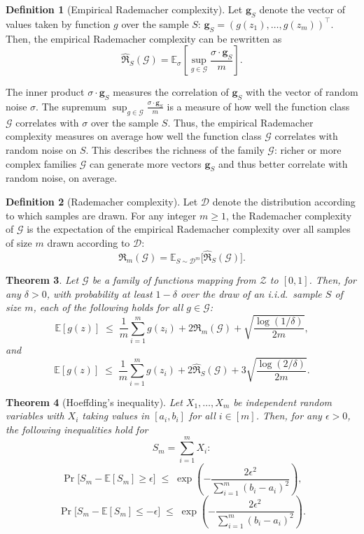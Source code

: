 \documentclass[12pt]{article}
\theoremstyle{definition} %
\newtheorem{definition}{Definition}[section]
\theoremstyle{plain} %
\newtheorem{theorem}[definition]{Theorem}
\theoremstyle{remark} %
\begin{document}
\begin{CJK}{UTF8}{gbsn}
\begin{definition}[Empirical Rademacher complexity]
Let $\mathbf{g}_S$ denote the vector of values taken by function $g$ over the sample $S$: 
$\mathbf{g}_S = (g(z_1), \ldots, g(z_m))^\top$. Then, the empirical Rademacher complexity 
can be rewritten as
\[
\hat{\mathfrak{R}}_S(\mathcal{G}) 
= \mathbb{E}_{\sigma} \left[ \sup_{g \in \mathcal{G}} \frac{\sigma \cdot \mathbf{g}_S}{m} \right].
\]

The inner product $\sigma \cdot \mathbf{g}_S$ measures the correlation of $\mathbf{g}_S$ 
with the vector of random noise $\sigma$. The supremum 
$\sup_{g \in \mathcal{G}} \frac{\sigma \cdot \mathbf{g}_S}{m}$ is a measure of how well 
the function class $\mathcal{G}$ correlates with $\sigma$ over the sample $S$. 
Thus, the empirical Rademacher complexity measures on average how well the function 
class $\mathcal{G}$ correlates with random noise on $S$. This describes the richness of 
the family $\mathcal{G}$: richer or more complex families $\mathcal{G}$ can generate more 
vectors $\mathbf{g}_S$ and thus better correlate with random noise, on average.
\end{definition}

\begin{definition}[Rademacher complexity]
Let $\mathcal{D}$ denote the distribution according to which samples are drawn. 
For any integer $m \geq 1$, the Rademacher complexity of $\mathcal{G}$ is the expectation of the 
empirical Rademacher complexity over all samples of size $m$ drawn according to $\mathcal{D}$:
\[
\mathfrak{R}_m(\mathcal{G}) 
= \mathbb{E}_{S \sim \mathcal{D}^m} \big[ \hat{\mathfrak{R}}_S(\mathcal{G}) \big].
\tag{3.2}
\]
\end{definition}

\begin{theorem}
Let $\mathcal{G}$ be a family of functions mapping from $\mathcal{Z}$ to $[0,1]$. 
Then, for any $\delta > 0$, with probability at least $1 - \delta$ over the draw of 
an i.i.d.\ sample $S$ of size $m$, each of the following holds for all $g \in \mathcal{G}$:
\[
\mathbb{E}[g(z)] \;\leq\; \frac{1}{m}\sum_{i=1}^m g(z_i) + 2 \mathfrak{R}_m(\mathcal{G}) 
+ \sqrt{\frac{\log (1/\delta)}{2m}}, \tag{3.3}
\]
and
\[
\mathbb{E}[g(z)] \;\leq\; \frac{1}{m}\sum_{i=1}^m g(z_i) + 2 \hat{\mathfrak{R}}_S(\mathcal{G}) 
+ 3\sqrt{\frac{\log (2/\delta)}{2m}}. \tag{3.4}
\]
\end{theorem}

\begin{theorem}[Hoeffding's inequality]
Let $X_1, \ldots, X_m$ be independent random variables with 
$X_i$ taking values in $[a_i, b_i]$ for all $i \in [m]$. 
Then, for any $\epsilon > 0$, the following inequalities hold for 
\[
S_m = \sum_{i=1}^m X_i:
\]
\[
\Pr\!\big[ S_m - \mathbb{E}[S_m] \geq \epsilon \big] 
\;\leq\; \exp\!\left(-\frac{2\epsilon^2}{\sum_{i=1}^m (b_i - a_i)^2}\right), \tag{D.4}
\]
\[
\Pr\!\big[ S_m - \mathbb{E}[S_m] \leq -\epsilon \big] 
\;\leq\; \exp\!\left(-\frac{2\epsilon^2}{\sum_{i=1}^m (b_i - a_i)^2}\right). \tag{D.5}
\]
\end{theorem}


\end{CJK}
\end{document}
